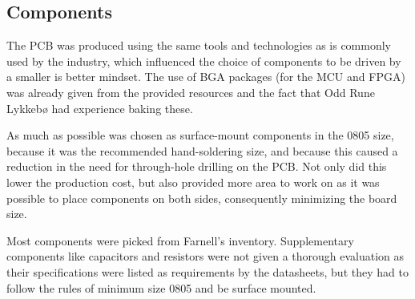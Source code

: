 
\subsection{Components}

The PCB was produced using the same tools and technologies as is commonly used
by the industry, which influenced the choice of components to be driven by a
smaller is better mindset. The use of BGA packages (for the MCU and FPGA) was
already given from the provided resources and the fact that Odd Rune Lykkebø had
experience baking these.

As much as possible was chosen as surface-mount components in the 0805 size,
because it was the recommended hand-soldering size, and because this caused a
reduction in the need for through-hole drilling on the PCB. Not only did this
lower the production cost, but also provided more area to work on as it was
possible to place components on both sides, consequently minimizing the board
size.

Most components were picked from Farnell's inventory. Supplementary components
like capacitors and resistors were not given a thorough evaluation as their
specifications were listed as requirements by the datasheets, but they had to
follow the rules of minimum size 0805 and be surface mounted.







